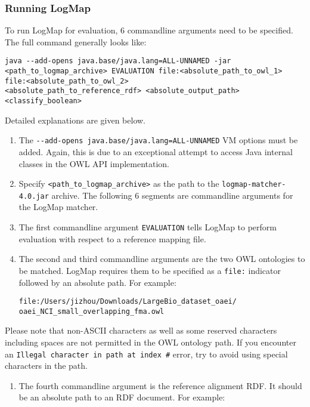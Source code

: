 \begin{appendices}
\subsubsection{Running LogMap}\label{running-logmap}

To run LogMap for evaluation, 6 commandline arguments need to be
specified. The full command generally looks like:

\texttt{java -{}-add-opens java.base/java.lang=ALL-UNNAMED -jar \textless{}path\_to\_logmap\_archive\textgreater{} EVALUATION file:\textless{}absolute\_path\_to\_owl\_1\textgreater{} file:\textless{}absolute\_path\_to\_owl\_2\textgreater{}\\\textless{}absolute\_path\_to\_reference\_rdf\textgreater{} \textless{}absolute\_output\_path\textgreater{} \textless{}classify\_boolean\textgreater{}}

Detailed explanations are given below.

\begin{enumerate}
\def\labelenumi{\arabic{enumi}.}
\item
  The \texttt{-{}-add-opens java.base/java.lang=ALL-UNNAMED} VM options
  must be added. Again, this is due to an exceptional attempt to access
  Java internal classes in the OWL API implementation.
\item
  Specify \texttt{\textless{}path\_to\_logmap\_archive\textgreater{}} as
  the path to the \texttt{logmap-matcher-4.0.jar} archive. The following
  6 segments are commandline arguments for the LogMap matcher.
\item
  The first commandline argument \texttt{EVALUATION} tells LogMap to
  perform evaluation with respect to a reference mapping file.
\item
  The second and third commandline arguments are the two OWL ontologies
  to be matched. LogMap requires them to be specified as a
  \texttt{file:} indicator followed by an absolute path. For example:

  \texttt{file:/Users/jizhou/Downloads/LargeBio\_dataset\_oaei/\\oaei\_NCI\_small\_overlapping\_fma.owl}
\end{enumerate}

Please note that non-ASCII characters as well as some reserved
characters including spaces are not permitted in the OWL ontology path.
If you encounter an \texttt{Illegal character in path at index \#}
error, try to avoid using special characters in the path.

\begin{enumerate}
\def\labelenumi{\arabic{enumi}.}
\setcounter{enumi}{4}
\item
  The fourth commandline argument is the reference alignment RDF. It
  should be an absolute path to an RDF document. For example:


\end{enumerate}
\end{appendices}
